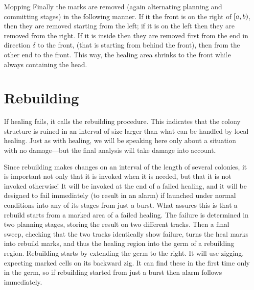 \documentclass[12pt]{memoir}
\begin{document}
\begin{flushdescription}
\item[Mopping]
Finally the marks are removed (again alternating planning and committing stages)
in the following manner.
If it the front is on the right of \( [a,b) \), then they are removed starting from the left;
if it is on the left then they are removed from the right.
If it is inside then they are removed first from the end in direction \( \delta \) to the front,
(that is starting from behind the front), then from the other end to the front.
This way, the healing area shrinks to the front while always containing the head.
\end{flushdescription}



\section{Rebuilding}\label{sec:rebuilding}

If healing fails, it calls the rebuilding procedure.
This indicates that the colony structure is ruined in an interval of size larger than 
what can be handled by local healing.
Just as with healing, we will be speaking here only about a situation with no 
damage---but the final analysis will take damage into account.

Since rebuilding makes changes on an interval of the length of several colonies,
it is important not only that it is invoked when it is needed, but that it is not
invoked otherwise!
It will be invoked at the end of a failed healing, and it will be designed
to fail immediately (to result in an alarm) 
if launched under normal conditions into any of its stages from just a burst.
What assures this is that a rebuild starts from a marked area of a failed
healing.
The failure is determined
in two planning stages, storing the result on two different tracks.
Then a final sweep, checking that the two tracks identically show failure, turns
the heal marks into rebuild marks, and thus the healing region into the germ of a
rebuilding region.
Rebuilding starts by extending the germ to the right.
It will use zigging, expecting marked cells on its backward zig.
It can find these in the first time only in the germ, so if rebuilding 
started from just a burst then alarm follows immediately.
\end{document}
